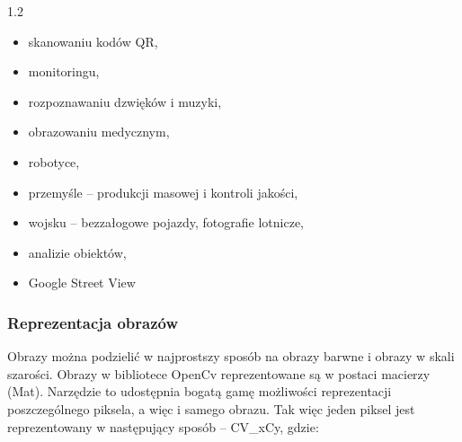 \documentclass[a4paper,12pt]{article}
\newcommand\spacingInSolemnItemize{1.2}
\newcommand\spacingIndent{2.2em}
\begin{document}
			    \begin{spacing}{\spacingInSolemnItemize}
			        \begin{itemize}
        				\item skanowaniu kodów QR,
        				\item monitoringu,
        				\item rozpoznawaniu dzwięków i muzyki,
        				\item obrazowaniu medycznym,
        				\item robotyce,	
        				\item przemyśle -- produkcji masowej i kontroli jakości,
        				\item wojsku -- bezzałogowe pojazdy, fotografie lotnicze,
				        \item analizie obiektów,
				        \item Google Street View
		            \end{itemize}
                \end{spacing}
    
    	\subsubsection{Reprezentacja obrazów}
			\hspace{\spacingIndent} Obrazy można podzielić w najprostszy sposób na obrazy barwne i obrazy w skali szarości. Obrazy w bibliotece OpenCv 
				reprezentowane są w postaci macierzy (Mat). Narzędzie to udostępnia bogatą gamę możliwości reprezentacji poszczególnego piksela, 
				a więc i samego obrazu. Tak więc jeden piksel jest reprezentowany w następujący sposób -- CV\_xCy, gdzie:
			
\end{document}
